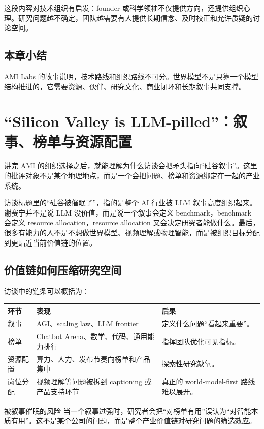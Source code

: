 \documentclass[a4paper]{article}
\begin{document}
这段内容对技术组织有启发：founder 或科学领袖不仅提供方向，还提供组织心理。研究问题越不确定，团队越需要有人提供长期信念、及时校正和允许质疑的讨论空间。

\subsection{本章小结}

AMI Labs 的故事说明，技术路线和组织路线不可分。世界模型不是只靠一个模型结构推进的，它需要资源、伙伴、研究文化、商业闭环和长期叙事共同支撑。

\section{“Silicon Valley is LLM-pilled”：叙事、榜单与资源配置}

讲完 AMI 的组织选择之后，就能理解为什么访谈会把矛头指向“硅谷叙事”。这里的批评对象不是某个地理地点，而是一个会把问题、榜单和资源绑定在一起的产业系统。

访谈标题里的“硅谷被催眠了”，指的是整个 AI 行业被 LLM 叙事高度组织起来。谢赛宁并不是说 LLM 没价值，而是说一个叙事会定义 benchmark，benchmark 会定义 resource allocation，resource allocation 又会决定研究者能做什么。最后，很多有能力的人不是不想做世界模型、视频理解或物理智能，而是被组织目标分配到更贴近当前价值链的位置。

\subsection{价值链如何压缩研究空间}

访谈中的链条可以概括为：

\begin{center}
\begin{tabularx}{0.95\textwidth}{p{}p{}X}
\toprule
环节 & 表现 & 后果 \\
\midrule
叙事 & AGI、scaling law、LLM frontier & 定义什么问题“看起来重要”。 \\
榜单 & Chatbot Arena、数学、代码、通用能力排行 & 指挥团队优化可见指标。 \\
资源配置 & 算力、人力、发布节奏向榜单和产品集中 & 探索性研究缺氧。 \\
岗位分配 & 视频理解等问题被拆到 captioning 或产品支持环节 & 真正的 world-model-first 路线难以展开。 \\
\bottomrule
\end{tabularx}
\end{center}

\begin{warningbox}{被叙事催眠的风险}
当一个叙事过强时，研究者会把“对榜单有用”误认为“对智能本质有用”。这不是某个公司的问题，而是整个产业价值链对研究问题的筛选效应。
\end{warningbox}
\end{document}
